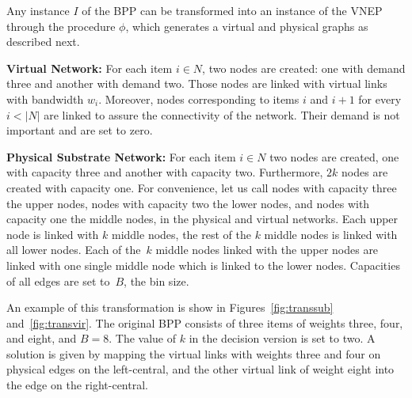 \documentclass[conference]{IEEEtran}
\begin{document}
Any instance $I$ of the BPP can be transformed into an instance of the VNEP through the procedure $\phi$, which generates a virtual and physical graphs as described next.

\textbf{Virtual Network:} For each item $i \in N$, two nodes are created: one with demand three and another with demand two. 
Those nodes are linked with virtual links with bandwidth $w_{i}$. 
Moreover, nodes corresponding to items $i$ and $i+1$ for every $i < |N|$ are linked to assure the connectivity of the network.
Their demand is not important and are set to zero.

\textbf{Physical Substrate Network:} For each item $i \in N$ two nodes are created, one with capacity three and another with capacity two. 
Furthermore, $2k$ nodes are created with capacity one. 
For convenience, let us call nodes with capacity three the upper nodes, nodes with capacity two the lower nodes, and nodes with capacity one the middle nodes, in the physical and virtual networks.
Each upper node is linked with $k$ middle nodes, the rest of the $k$ middle nodes is linked with all lower nodes. 
Each of the~$k$ middle nodes linked with the upper nodes are linked with one single middle node which is linked to the lower nodes. 
Capacities of all edges are set to~$B$, the bin size.

An example of this transformation is show in Figures~\ref{fig:transsub} and~\ref{fig:transvir}. 
The original BPP consists of three items of weights three, four, and eight, and $B=8$. 
The value of $k$ in the decision version is set to two. 
A solution is given by mapping the virtual links with weights three and four on physical edges on the left-central, 
and the other virtual link of weight eight into the edge on the right-central.
\end{document}
